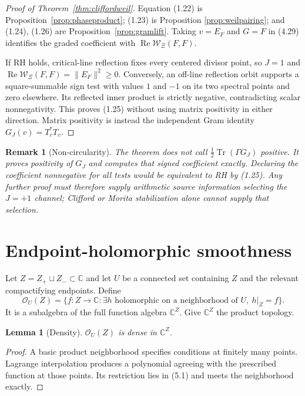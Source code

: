\documentclass[11pt,reqno]{amsart}
\newtheorem{lemma}[theorem]{Lemma}
\newtheorem{remark}[theorem]{Remark}
\newcommand{\C}{\mathbb C}
\newcommand{\Tr}{\operatorname{Tr}}
\newcommand{\cO}{\mathcal O}
\begin{document}
\begin{proof}[Proof of Theorem~\ref{thm:cliffordweil}]
Equation (1.22) is Proposition~\ref{prop:phaseproduct}; (1.23) is Proposition
\ref{prop:weilpairing}; and (1.24), (1.26) are Proposition~\ref{prop:gramlift}.  Taking $v=E_F$
and $G=F$ in (4.29) identifies the graded coefficient with
$\operatorname{Re}\mathcal W_\Xi(F,F)$.

If RH holds, critical-line reflection fixes every centered divisor point, so $J=1$ and
$\operatorname{Re}\mathcal W_\Xi(F,F)=\|E_F\|^2\ge0$.  Conversely, an off-line reflection orbit
supports a square-summable sign test with values $1$ and $-1$ on its two spectral points and zero
elsewhere.  Its reflected inner product is strictly negative, contradicting scalar
nonnegativity.  This proves (1.25) without using matrix positivity in either direction.  Matrix
positivity is instead the independent Gram identity $G_J(v)=T_v^*T_v$.
\end{proof}

\begin{remark}[Non-circularity]
The theorem does not call $\frac12\Tr(\Gamma G_J)$ positive.  It proves positivity of $G_J$ and
computes that signed coefficient exactly.  Declaring the coefficient nonnegative for all tests
would be equivalent to RH by (1.25).  Any further proof must therefore supply arithmetic source
information selecting the $J=+1$ channel; Clifford or Morita stabilization alone cannot supply
that selection.
\end{remark}

\section{Endpoint-holomorphic smoothness}\label{sec:p3}

Let $Z=Z_+\sqcup Z_-\subset\C$ and let $U$ be a connected set containing $Z$ and the relevant
compactifying endpoints.  Define
\[
 \cO_U(Z)=\{f:Z\to\C:\exists h\text{ holomorphic on a neighborhood of }U,
                         \ h|_Z=f\}.                  \tag{5.1}
\]
It is a subalgebra of the full function algebra $\C^Z$.  Give $\C^Z$ the product topology.

\begin{lemma}[Density]\label{lem:density}
$\cO_U(Z)$ is dense in $\C^Z$.
\end{lemma}

\begin{proof}
A basic product neighborhood specifies conditions at finitely many points.  Lagrange interpolation
produces a polynomial agreeing with the prescribed function at those points.  Its restriction lies
in (5.1) and meets the neighborhood exactly.
\end{proof}
\end{document}
